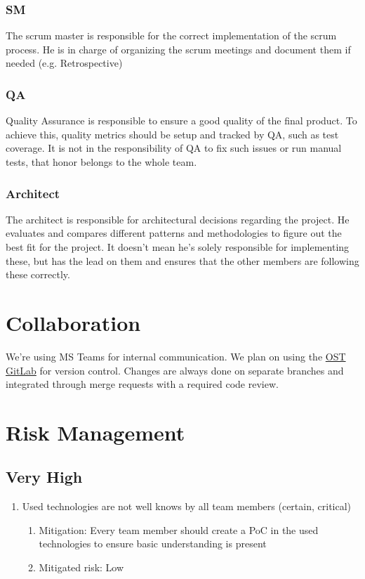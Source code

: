 \subsubsection*{SM}
The scrum master is responsible for the correct implementation of the scrum process.
He is in charge of organizing the scrum meetings and document them if needed (e.g. Retrospective)

\subsubsection*{QA}
Quality Assurance is responsible to ensure a good quality of the final product.
To achieve this, quality metrics should be setup and tracked by QA, such as test coverage.
It is not in the responsibility of QA to fix such issues or run manual tests, that honor belongs to the whole team.

\subsubsection*{Architect}
The architect is responsible for architectural decisions regarding the project.
He evaluates and compares different patterns and methodologies to figure out the best fit for the project.
It doesn't mean he's solely responsible for implementing these, but has the lead on them and ensures that the other members are following these correctly.

\section{Collaboration}

We're using MS Teams for internal communication.
We plan on using the \href{https://gitlab.ost.ch/SEProj/2022-FS/g02-jasstracker/jasstracker}{OST GitLab} for version control.
Changes are always done on separate branches and integrated through merge requests with a required code review.

\section{Risk Management}

\subsection{Very High}
\begin{enumerate}
    \item Used technologies are not well knows by all team members (certain, critical) 
    \begin{enumerate}
        \item Mitigation: Every team member should create a PoC in the used technologies to ensure basic understanding is present
        \item Mitigated risk: Low
    \end{enumerate}
\end{enumerate}

